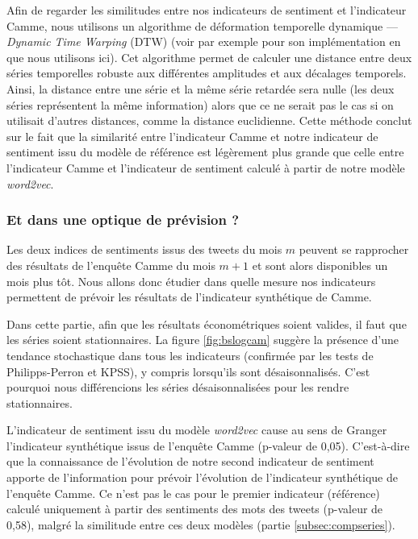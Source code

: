 \documentclass[11pt,french,french]{article}
\begin{document}
Afin de regarder les similitudes entre nos indicateurs de sentiment et
l'indicateur Camme, nous utilisons un algorithme de déformation
temporelle dynamique --- \emph{Dynamic Time Warping} (DTW) (voir par
exemple \cite{dtw} pour son implémentation en \faRProject{} que nous
utilisons ici). Cet algorithme permet de calculer une distance entre
deux séries temporelles robuste aux différentes amplitudes et aux
décalages temporels. Ainsi, la distance entre une série et la même série
retardée sera nulle (les deux séries représentent la même information)
alors que ce ne serait pas le cas si on utilisait d'autres distances,
comme la distance euclidienne. Cette méthode conclut sur le fait que la
similarité entre l'indicateur Camme et notre indicateur de sentiment
issu du modèle de référence est légèrement plus grande que celle entre
l'indicateur Camme et l'indicateur de sentiment calculé à partir de
notre modèle \emph{word2vec}.

\subsubsection{Et dans une optique de prévision
?}\label{et-dans-une-optique-de-pruxe9vision}

Les deux indices de sentiments issus des tweets du mois \(m\) peuvent se
rapprocher des résultats de l'enquête Camme du mois \(m+1\) et sont
alors disponibles un mois plus tôt. Nous allons donc étudier dans quelle
mesure nos indicateurs permettent de prévoir les résultats de
l'indicateur synthétique de Camme.

Dans cette partie, afin que les résultats économétriques soient valides,
il faut que les séries soient stationnaires. La figure
\ref{fig:bslogcam} suggère la présence d'une tendance stochastique dans
tous les indicateurs (confirmée par les tests de Philipps-Perron et
KPSS), y compris lorsqu'ils sont désaisonnalisés. C'est pourquoi nous
différencions les séries désaisonnalisées pour les rendre stationnaires.

L'indicateur de sentiment issu du modèle \emph{word2vec} cause au sens
de Granger l'indicateur synthétique issus de l'enquête Camme (p-valeur
de 0,05). C'est-à-dire que la connaissance de l'évolution de notre
second indicateur de sentiment apporte de l'information pour prévoir
l'évolution de l'indicateur synthétique de l'enquête Camme. Ce n'est pas
le cas pour le premier indicateur (référence) calculé uniquement à
partir des sentiments des mots des tweets (p-valeur de 0,58), malgré la
similitude entre ces deux modèles (partie \ref{subsec:compseries}).
\end{document}
